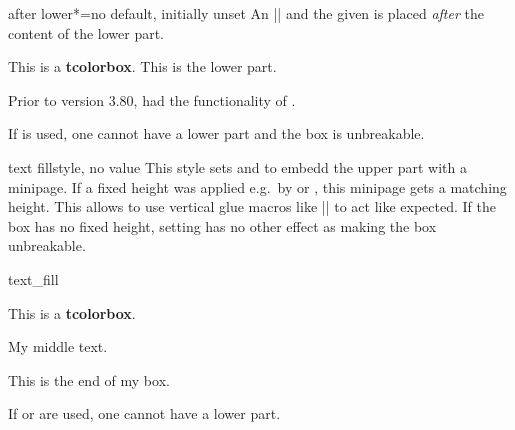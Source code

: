 \begin{docTcbKey}[][doc new=2015-11-27]{after lower*}{=}{no default, initially unset}
  An |\unskip| and the given  is placed \emph{after} the content of the lower part.
\begin{dispExample}
\begin{tcolorbox}[after lower*=\ \textit{This is the end.},
  colback=red!5!white,colframe=red!75!black]
This is a \textbf{tcolorbox}.
\tcblower
This is the lower part.
\end{tcolorbox}
\end{dispExample}

\begin{marker}
Prior to version 3.80,  had the functionality
of .
\end{marker}
\end{docTcbKey}


\clearpage
\begin{marker}
If  is used, one cannot have a lower part
and the box is unbreakable.
\end{marker}

\begin{docTcbKey}[][doc new=2015-07-15]{text fill}{}{style, no value}
  This style sets  and 
  to embedd the upper part with a minipage. If a fixed height was applied
  e.g.\ by  or , this minipage
  gets a matching height. This allows to use vertical glue macros like
  |\vfill| to act like expected. If the box has no fixed height,
  setting  has no other effect as making the box
  unbreakable.
\begin{exdispExample}{text_fill}
\begin{tcolorbox}[colback=red!5!white,colframe=red!75!black,fonttitle=\bfseries,
  height=8cm,text fill,
  title=My filled box]
This is a \textbf{tcolorbox}.
\par\vfill
\begin{center}
  My middle text.
\end{center}
\par\vfill
This is the end of my box.
\end{tcolorbox}
\end{exdispExample}
\end{docTcbKey}

\clearpage
\begin{marker}
If  or  are used, one cannot
have a lower part.
\end{marker}

